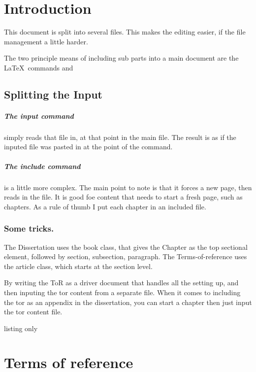 
\chapter{Introduction}
This document is split into several files.  This makes the editing easier, if the file management a little harder.

The two principle means of including sub parts into a main document are the \LaTeX\ commands \verb"" and \verb""
\section{Splitting the Input}
\paragraph{The input command } simply reads that file in, at that point in the main file.  The result is as if the inputed file was pasted in at the point of the command.

\paragraph{The include command} is a little more complex.  The main point to note is that it forces a new page, then reads in the file.  It is good foe content that needs to start a fresh page, such as chapters.  As a rule of thumb I put each chapter in an included file.

\subsection{Some tricks.}  The Dissertation uses the book class, that gives the Chapter as the top sectional element, followed by section, subsection, paragraph.   The Terms-of-reference uses the article class, which starts at the section level.

By writing the ToR as a driver document that handles all the setting up, and then inputing the tor content from a separate file.  When it comes to including the tor as an appendix in the dissertation, you can start a chapter then just input the tor content file.

\begin{tcblisting}{listing only}
    \appendix
    \chapter{Terms of reference}
    
\end{tcblisting}

